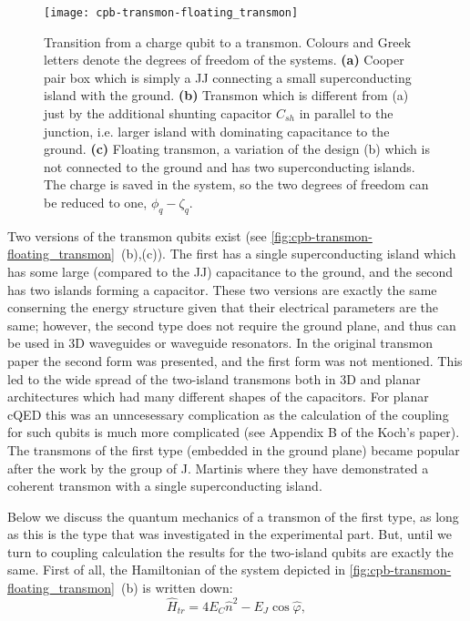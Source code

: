 \documentclass[12pt, twoside]{report}
\numberwithin{equation}{section}
\begin{document}
\begin{figure}[h!]
\centering
\texttt{[image: cpb-transmon-floating\_transmon]}
\caption{Transition from a charge qubit to a transmon. Colours and Greek letters denote the degrees of freedom of the systems. \textbf{(a)} Cooper pair box which is simply a JJ connecting a small superconducting island with the ground. \textbf{(b)} Transmon which is different from (a) just by the additional shunting capacitor $C_{sh}$ in parallel to the junction, i.e. larger island with dominating capacitance to the ground. \textbf{(c)} Floating transmon, a variation of the design (b) which is not connected to the ground and has two superconducting islands. The charge is saved in the system, so the two degrees of freedom can be reduced to one, $\phi_q - \zeta_q$.}
\label{fig:cpb-transmon-floating_transmon}
\end{figure}

Two versions of the transmon qubits exist (see \autoref{fig:cpb-transmon-floating_transmon}~(b),(c)). The first has a single superconducting island which has some large (compared to the JJ) capacitance to the ground, and the second has two islands forming a capacitor. These two versions are exactly the same conserning the energy structure given that their electrical parameters are the same; however, the second type does not require the ground plane, and thus can be used in 3D waveguides or waveguide resonators\cite{paik2011}. In the original transmon paper\cite{Koch2007} the second form was presented, and the first form was not mentioned. This led to the wide spread of the two-island transmons both in 3D and planar architectures which had many different shapes of the capacitors. For planar cQED this was an unncesessary complication as the calculation of the coupling for such qubits is much more complicated (see Appendix B of the Koch's paper). The transmons of the first type (embedded in the ground plane) became popular after the work\cite{barends2013} by the group of J. Martinis where they have demonstrated a coherent transmon with a single superconducting island.

Below we discuss the quantum mechanics of a transmon of the first type, as long as this is the type that was investigated in the experimental part. But, until we turn to coupling calculation the results for the two-island qubits are exactly the same. First of all, the Hamiltonian of the system depicted in \autoref{fig:cpb-transmon-floating_transmon}~(b) is written down:
\begin{equation}
\hat H_{tr} = 4E_C \hat n^2 - E_J\cos \hat \varphi,
\label{eq:tr_ham}
\end{equation}
\end{document}
